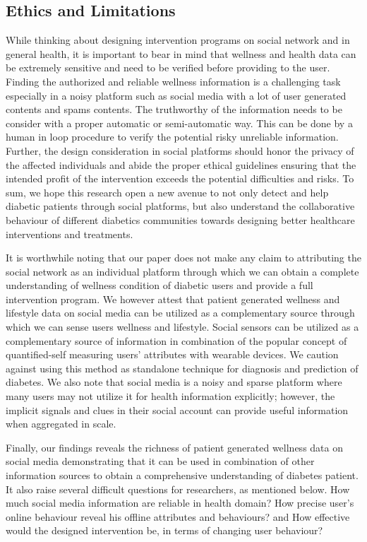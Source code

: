 \documentclass{acm_proc_article-sp}
\begin{document}
\subsection{Ethics and Limitations}
While thinking about designing intervention programs on social network and in general health, it is important to bear in mind that wellness and health data can be extremely sensitive and need to be verified before providing to the user. Finding the authorized and reliable wellness information is a challenging task especially in a noisy platform such as social media with a lot of user generated contents and spams contents. The truthworthy of the information needs to be consider with a proper automatic or semi-automatic way. This can be done by a human in loop procedure to verify the potential risky unreliable information. Further, the design consideration in social platforms should honor the privacy of the affected individuals and abide the proper ethical guidelines ensuring that the intended profit of the intervention exceeds the potential difficulties and risks. To sum, we hope this research open a new avenue to not only detect and help diabetic patients through social platforms, but also understand the collaborative behaviour of different diabetics communities towards designing better healthcare interventions and treatments.

It is worthwhile noting that our paper does not make any claim to attributing the social network as an individual platform through which we can obtain a complete understanding of wellness condition of diabetic users and provide a full intervention program. We however attest that patient generated wellness and lifestyle data on social media can be utilized as a complementary source through which we can sense users wellness and lifestyle. Social sensors can be utilized as a complementary source of information in combination of the popular concept of quantified-self measuring users' attributes with wearable devices. We caution against using this method as standalone technique for diagnosis and prediction of diabetes. We also note that social media is a noisy and sparse platform where many users may not utilize it for health information explicitly; however, the implicit signals and clues in their social account can provide useful information when aggregated in scale.

Finally, our findings reveals the richness of patient generated wellness data on social media demonstrating that it can be used in combination of other information sources to obtain a comprehensive understanding of diabetes patient. It also raise several difficult questions for researchers, as mentioned below. How much social media information are reliable in health domain? How precise user's online behaviour reveal his offline attributes and behaviours? and How effective would the designed intervention be, in terms of changing user behaviour?
\end{document}
